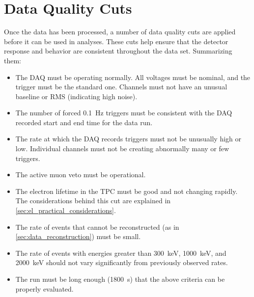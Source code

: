 \documentclass[herrin-thesis.tex]{subfiles}
\begin{document}
\section{Data Quality Cuts}
Once the data has been processed, a number of data quality cuts are applied before it can be used in analyses. These cuts help ensure that the detector response and behavior are consistent throughout the data set. Summarizing them:
\begin{itemize}
\item The DAQ must be operating normally. All voltages must be nominal, and the trigger must be the standard one. Channels must not have an unusual baseline or RMS (indicating high noise).
\item The number of forced \SI{0.1}{\Hz} triggers must be consistent with the DAQ recorded start and end time for the data run.
\item The rate at which the DAQ records triggers must not be unusually high or low. Individual channels must not be creating abnormally many or few triggers.
\item The active muon veto must be operational.
\item The electron lifetime in the TPC must be good and not changing rapidly. The considerations behind this cut are explained in \cref{sec:el_practical_considerations}.
\item The rate of events that cannot be reconstructed (as in \cref{sec:data_reconstruction}) must be small.
\item The rate of events with energies greater than \SI{300}{\keV}, \SI{1000}{\keV}, and \SI{2000}{\keV} should not vary significantly from previously observed rates.
\item The run must be long enough (\SI{1800}{\s}) that the above criteria can be properly evaluated.
\end{itemize}
\end{document}
